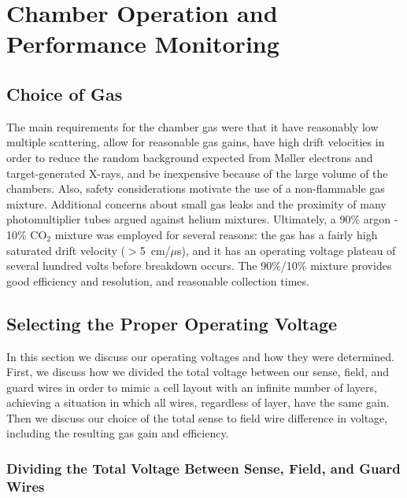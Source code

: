 \section{Chamber Operation and Performance Monitoring}

\subsection{Choice of Gas}

The main requirements for the chamber gas were that it have reasonably low 
multiple scattering, allow for reasonable gas gains, have high drift velocities
in order to reduce the random background expected from M{\o}ller 
electrons and target-generated X-rays, and be inexpensive because of the 
large volume of the chambers. Also, safety considerations motivate the use of
a non-flammable gas mixture.  Additional concerns about small gas 
leaks and the proximity of many photomultiplier tubes argued against helium 
mixtures.  Ultimately, a 90\% argon - 10\% CO$_2$ mixture was employed 
for several reasons: the gas has a fairly high saturated drift velocity 
($>$5~cm/$\mu$s), and it has an operating voltage plateau of several hundred 
volts before breakdown occurs.  The 90\%/10\% mixture 
provides good efficiency and resolution, and reasonable collection times.

\subsection{Selecting the Proper Operating Voltage}

In this section we discuss our operating voltages and how they were determined.
First, we discuss how we divided the total voltage between our sense, field, 
and guard wires in order to mimic a cell layout with an infinite number of
layers, achieving a situation in which all wires, regardless of layer, have
the same gain.  Then we discuss our choice of the total sense to field
wire difference in voltage, including the resulting gas gain and efficiency.

\subsubsection{Dividing the Total Voltage Between Sense, Field, and Guard Wires}

